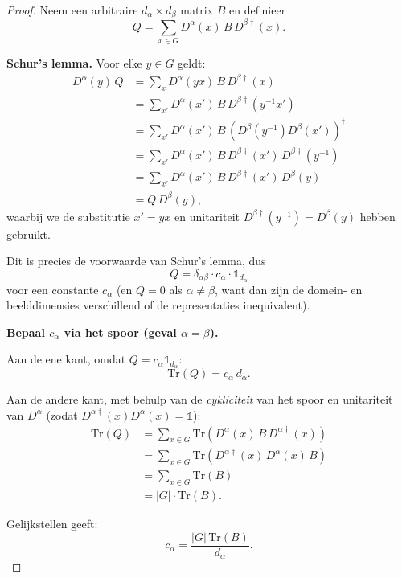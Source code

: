 \begin{proof}
    Neem een arbitraire \(d_\alpha \times d_\beta\) matrix \(B\) en definieer
    \[
    Q = \sum_{x\in G} D^\alpha(x)\, B\, D^{\beta\dagger}(x).
    \]

    \textbf{Schur's lemma.}
    Voor elke \(y \in G\) geldt:
    \begin{align*}
        D^\alpha(y)\, Q
        &= \sum_x D^\alpha(yx)\, B\, D^{\beta\dagger}(x) \\
        &= \sum_{x'} D^\alpha(x')\, B\, D^{\beta\dagger}(y^{-1}x') \\
        &= \sum_{x'} D^\alpha(x')\, B\, \left(D^\beta(y^{-1})D^\beta(x')\right)^\dagger \\
        &= \sum_{x'} D^\alpha(x')\, B\, D^{\beta\dagger}(x')\, D^{\beta\dagger}(y^{-1}) \\
        &= \sum_{x'} D^\alpha(x')\, B\, D^{\beta\dagger}(x')\, D^{\beta}(y) \\
        &= Q\, D^\beta(y),
    \end{align*}
    waarbij we de substitutie \(x' = yx\) en unitariteit \(D^{\beta\dagger}(y^{-1}) = D^\beta(y)\) hebben gebruikt.

    Dit is precies de voorwaarde van Schur's lemma, dus
    \[
    Q = \delta_{\alpha\beta} \cdot c_\alpha \cdot \mathds{1}_{d_\alpha}
    \]
    voor een constante \(c_\alpha\) (en \(Q=0\) als \(\alpha \neq \beta\), want dan zijn de domein- en beelddimensies verschillend of de representaties inequivalent).

    \medskip
    \textbf{Bepaal \(c_\alpha\) via het spoor (geval \(\alpha = \beta\)).}

    Aan de ene kant, omdat \(Q = c_\alpha \mathds{1}_{d_\alpha}\):
    \[
    \text{Tr}(Q) = c_\alpha\, d_\alpha.
    \]

    Aan de andere kant, met behulp van de \emph{cykliciteit} van het spoor en unitariteit van \(D^\alpha\) (zodat \(D^{\alpha\dagger}(x)D^\alpha(x) = \mathds{1}\)):
    \begin{align*}
        \text{Tr}(Q)
        &= \sum_{x \in G} \text{Tr}\left(D^\alpha(x)\, B\, D^{\alpha\dagger}(x)\right) \\
        &= \sum_{x \in G} \text{Tr}\left(D^{\alpha\dagger}(x)\, D^\alpha(x)\, B\right) \\
        &= \sum_{x \in G} \text{Tr}(B) \\
        &= |G| \cdot \text{Tr}(B).
    \end{align*}

    Gelijkstellen geeft:
    \[
    c_\alpha = \frac{|G|\, \text{Tr}(B)}{d_\alpha}.
    \]


\end{proof}

